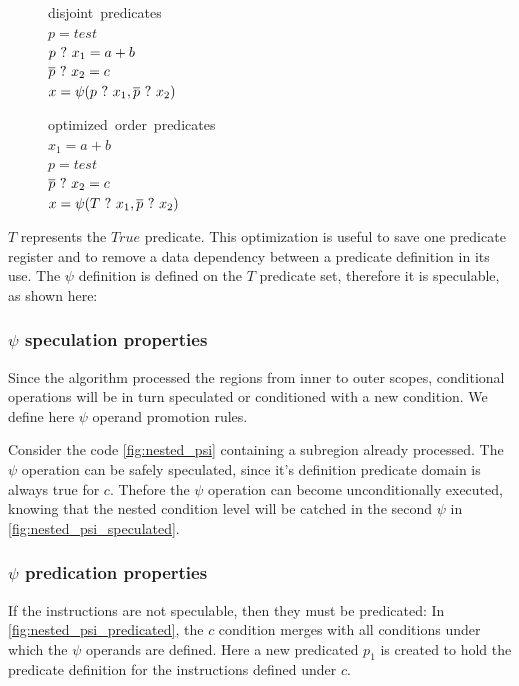 \begin{figure}
\footnotesize
\begin{minipage}[t]{4cm}
\mbox{disjoint predicates} \\
$ p = test $ \\
$ p ~?~ x_1 = a + b $ \\
$ \overline{p} ~?~ x_2 = c $ \\
$ x = \psi(p ~?~ x_1, \overline{p} ~?~ x_2) $ \\
\end{minipage}
\begin{minipage}[t]{4cm}
\mbox{optimized order predicates} \\
$ x_1 = a + b $ \\
$ p = test $ \\
$ \overline{p} ~?~ x_2 = c $ \\
$ x = \psi(T ~?~ x_1, \overline{p} ~?~ x_2) $ \\
\end{minipage}
\end{figure}

$T$ represents the $True$ predicate. This optimization is useful to save one predicate register and to remove a data dependency between a predicate definition in its use. 
The $\psi$ definition is defined on the $T$ predicate set, therefore it is speculable, as shown here:

\subsubsection{$\psi$ speculation properties}

Since the algorithm processed the regions from inner to outer scopes, conditional operations will be in turn speculated or conditioned with a new condition. We define here $\psi$ operand promotion rules.

Consider the code \ref{fig:nested_psi} containing a subregion already processed. The $\psi$ operation can be safely speculated, since it's definition predicate domain is always true for $c$. Thefore the $\psi$ operation can become unconditionally executed, knowing that the nested condition level will be catched in the second $\psi$ in \ref{fig:nested_psi_speculated}.

\subsubsection{$\psi$ predication properties}

If the instructions are not speculable, then they must be predicated:
In \ref{fig:nested_psi_predicated}, the $c$ condition merges with all conditions under which the $\psi$ operands are defined. Here a new predicated $p_1$ is created to hold the predicate definition for the instructions defined under $c$. 

